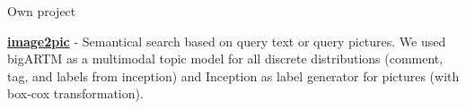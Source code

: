 


\begin{cventries}




\cventry
{} %
{Own project} %
{} %
{} %
{ %
\begin{cvitems}
\item {\href{https://github.com/menshikh-iv/image2pic}{\textbf{image2pic}} - Semantical search based on query text or query pictures. We used bigARTM as a multimodal topic model for all discrete distributions (comment, tag, and labels from inception) and Inception as label generator for pictures (with box-cox transformation).}
\end{cvitems}
}

\end{cventries}